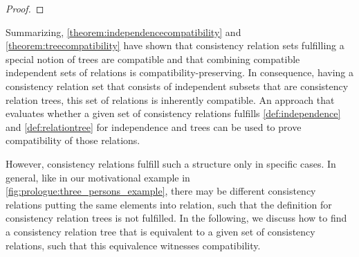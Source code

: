 \begin{proof}
    
\end{proof}

Summarizing, \autoref{theorem:independencecompatibility} and \autoref{theorem:treecompatibility} have shown that consistency relation sets fulfilling a special notion of trees are compatible and that combining compatible independent sets of relations is compatibility-preserving.
In consequence, having a consistency relation set that consists of independent subsets that are consistency relation trees, this set of relations is inherently compatible.
An approach that evaluates whether a given set of consistency relations fulfills \autoref{def:independence} and \autoref{def:relationtree} for independence and trees can be used to prove compatibility of those relations.

However, consistency relations fulfill such a structure only in specific cases.
In general, like in our motivational example in \autoref{fig:prologue:three_persons_example}, there may be different consistency relations putting the same elements into relation, such that the definition for consistency relation trees is not fulfilled.
In the following, we discuss how to find a consistency relation tree that is equivalent to a given set of consistency relations, such that this equivalence witnesses compatibility.